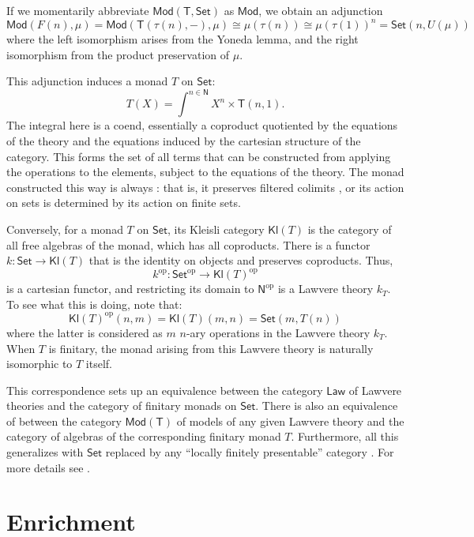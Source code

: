 \documentclass{amsart}
\newcommand{\define}[1]{{\bf \boldmath{#1}}}
\theoremstyle{definition}
\newcommand{\Set}{\mathsf{Set}}
\newcommand{\Law}{\mathsf{Law}}
\newcommand{\Mod}{\mathsf{Mod}}
\newcommand{\NN}{\mathsf{N}}
\newcommand{\T}{\mathsf{T}}
\newcommand{\Kl}{\mathsf{Kl}}
\newcommand{\op}{\mathrm{op}}
\newcommand{\maps}{\colon}
\begin{document}
If we momentarily abbreviate $\Mod(\T,\Set)$ as $\Mod$, we obtain an adjunction
\[   \Mod(F(n),\mu) = \Mod(\T(\tau(n),-),\mu) \cong \mu(\tau(n)) \cong \mu(\tau(1))^n = \Set(n,U(\mu))\] 
where the left isomorphism arises from the Yoneda lemma, and the right isomorphism from the product preservation of $\mu$.   

This adjunction induces a monad $T$ on $\Set$:
\begin{equation}
T(X) = \int^{n\in \NN} X^n \times \T(n,1).
\end{equation}
The integral here is a coend, essentially a coproduct quotiented by the equations of the theory and the equations induced by the cartesian structure of the category. This forms the set of all terms that can be constructed from applying the operations to the elements, subject to the equations of the theory.  The monad constructed this way is always \define{finitary}: that is, it preserves filtered colimits \cite{adamekrosicky}, or its action on sets is determined by its action on finite sets.

Conversely, for a monad $T$ on $\Set$, its Kleisli category $\Kl(T)$ is the category of all free algebras of the monad, which has all coproducts. There is a functor $k\maps \Set \to \Kl(T)$ that is the identity on objects and preserves coproducts. Thus,
\[ k^{\op}\maps \Set^{\op} \to \Kl(T)^{\op} \]
is a cartesian functor, and restricting its domain to $\NN^{\op}$ is a Lawvere theory $k_T$. To see what this is doing, note that:
$$\Kl(T)^{\op}(n,m) = \Kl(T)(m,n) = \Set(m,T(n))$$
where the latter is considered as $m$ $n$-ary operations in the Lawvere theory $k_T$.
When $T$ is finitary, the monad arising from this Lawvere theory is naturally isomorphic to $T$ itself.

This correspondence sets up an equivalence between the category $\Law$ of Lawvere theories and the category of finitary monads on $\Set$.  There is also an equivalence of between the category $\Mod(\T)$ of models of any given Lawvere theory and the category of algebras of the corresponding finitary monad $T$.  Furthermore, all this generalizes with $\Set$ replaced by any ``locally finitely presentable'' category \cite{adamekrosicky}. For more details see \cite{barrwells,lawvere,milewski}.

\section{Enrichment}
\label{sec:enrichment}
\end{document}
